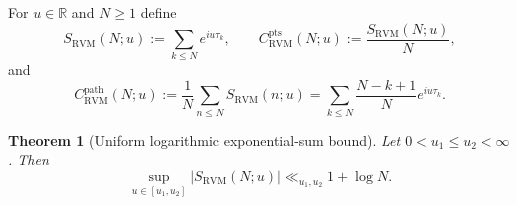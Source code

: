 \documentclass[11pt,reqno]{amsart}
\numberwithin{equation}{section}
\theoremstyle{plain}
\newtheorem{theorem}{Theorem}[section]
\theoremstyle{definition}
\theoremstyle{remark}
\newcommand{\R}{\mathbb R}
\newcommand{\RVM}{\mathrm{RVM}}
\newcommand{\pts}{\mathrm{pts}}
\newcommand{\pathc}{\mathrm{path}}
\begin{document}
For $u\in\R$ and $N\ge1$ define
\begin{equation}\label{eq:S-RVM}
 S_{\RVM}(N;u):=\sum_{k\le N}e^{iu\tau_k},
 \qquad
 C_{\RVM}^{\pts}(N;u):=\frac{S_{\RVM}(N;u)}{N},
\end{equation}
and
\begin{equation}\label{eq:path-centroid}
 C_{\RVM}^{\pathc}(N;u):=\frac1N\sum_{n\le N}S_{\RVM}(n;u)
 =\sum_{k\le N}\frac{N-k+1}{N}e^{iu\tau_k}.
\end{equation}

\begin{theorem}[Uniform logarithmic exponential-sum bound]\label{thm:exp-sum}
Let $0<u_1\le u_2<\infty$.  Then
\begin{equation}\label{eq:exp-sum-bound}
 \sup_{u\in[u_1,u_2]}|S_{\RVM}(N;u)|\ll_{u_1,u_2}1+\log N .
\end{equation}
\end{theorem}
\end{document}
